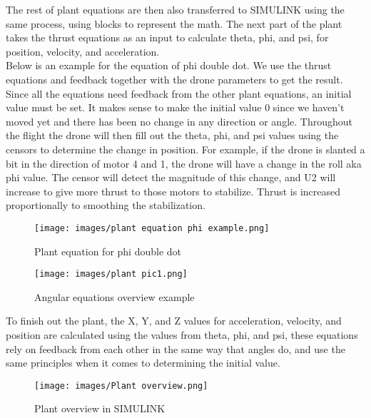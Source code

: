 \documentclass{article}
\begin{document}
The rest of plant equations are then also transferred to SIMULINK using the same process, using blocks to represent the math. The next part of the plant takes the thrust equations as an input to calculate theta, phi, and psi, for position, velocity, and acceleration. \\

Below is an example for the equation of phi double dot. We use the thrust equations and feedback together with the drone parameters to get the result. Since all the equations need feedback from the other plant equations, an initial value must be set. It makes sense to make the initial value 0 since we haven’t moved yet and there has been no change in any direction or angle. Throughout the flight the drone will then fill out the theta, phi, and psi values using the censors to determine the change in position. For example, if the drone is slanted a bit in the direction of motor 4 and 1, the drone will have a change in the roll aka phi value. The censor will detect the magnitude of this change, and U2 will increase to give more thrust to those motors to stabilize. Thrust is increased proportionally to smoothing the stabilization. 

\begin{figure}[H]
\begin{center}
   \texttt{[image: images/plant equation phi example.png]}
\end{center}
\caption{Plant equation for phi double dot}
\end{figure}

\begin{figure}[H]
\begin{center}
   \texttt{[image: images/plant pic1.png]}
\end{center}
\caption{Angular equations overview example}
\end{figure}

To finish out the plant, the X, Y, and Z values for acceleration, velocity, and position are calculated using the values from theta, phi, and psi, these equations rely on feedback from each other in the same way that angles do, and use the same principles when it comes to determining the initial value. 

\begin{figure}[H]
   \texttt{[image: images/Plant overview.png]}
\caption{Plant overview in SIMULINK}
\end{figure}



\end{document}
